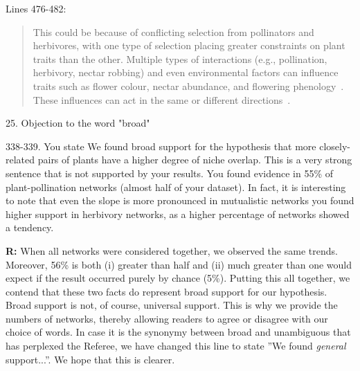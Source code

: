 \documentclass[12pt]{letter}
\newenvironment{refquote}{\bigskip \begin{it}}{\end{it}\smallskip}
\begin{document}
		Lines 476-482:

		\begin{quotation}

			This could be because of conflicting selection from pollinators and herbivores,
			with one type of selection placing greater constraints on plant traits than the other.
			Multiple types of interactions (e.g., pollination, herbivory, nectar robbing) 
			and even environmental factors can influence traits such as 
			flower colour, nectar abundance, and flowering phenology~\citep{Strauss2006}. 
			These influences can act in the same or different directions~\citep{Strauss2006}.

		\end{quotation}


	25. Objection to the word "broad"

		\begin{refquote}
			338-339. You state We found broad support for the hypothesis that more closely-related pairs of plants have a higher degree of niche overlap. This is a very strong sentence that is not supported by your results. You found evidence in 55\% of plant-pollination networks (almost half of your dataset). In fact, it is interesting to note that even the slope is more pronounced in mutualistic networks you found higher support in herbivory networks, as a higher percentage of networks showed a tendency.
		\end{refquote}


		\textbf{R:} When all networks were considered together, we observed the same trends. Moreover, 56\% is both (i) greater than half and (ii) much greater than one would expect if the result occurred purely by chance (5\%). Putting this all together, we contend that these two facts do represent broad support for our hypothesis.
		Broad support is not, of course, universal support. This is why we provide the numbers of networks, thereby allowing readers to agree or disagree with our choice of words. In case it is the synonymy between broad and unambiguous that has perplexed the Referee, we have changed this line to state ''We found \emph{general} support...''. We hope that this is clearer.
\end{document}
